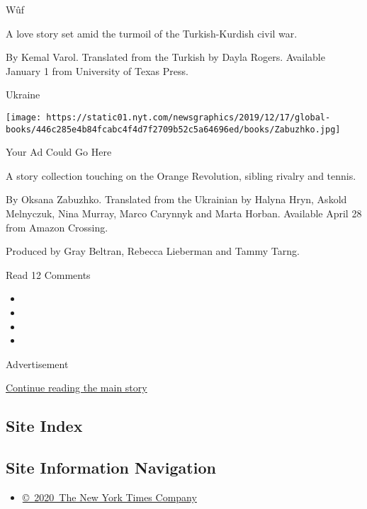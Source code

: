 Wûf

A love story set amid the turmoil of the Turkish-Kurdish civil war.

 By Kemal Varol. Translated from the Turkish by Dayla Rogers. Available
January 1 from University of Texas Press.

Ukraine

\texttt{[image: https://static01.nyt.com/newsgraphics/2019/12/17/global-books/446c285e4b84fcabc4f4d7f2709b52c5a64696ed/books/Zabuzhko.jpg]}

Your Ad Could Go Here

A story collection touching on the Orange Revolution, sibling rivalry
and tennis.

 By Oksana Zabuzhko. Translated from the Ukrainian by Halyna Hryn,
Askold Melnyczuk, Nina Murray, Marco Carynnyk and Marta Horban.
Available April 28 from Amazon Crossing.

Produced by Gray Beltran, Rebecca Lieberman and Tammy Tarng.

Read 12 Comments

\begin{itemize}
\item
\item
\item
\item
\end{itemize}

Advertisement

\protect\hyperlink{after-bottom}{Continue reading the main story}

\hypertarget{site-index}{%
\subsection{Site Index}\label{site-index}}

\hypertarget{site-information-navigation}{%
\subsection{Site Information
Navigation}\label{site-information-navigation}}

\begin{itemize}
\tightlist
\item
  \href{https://help.nytimes.com/hc/en-us/articles/115014792127-Copyright-notice}{©~2020~The
  New York Times Company}
\end{itemize}

